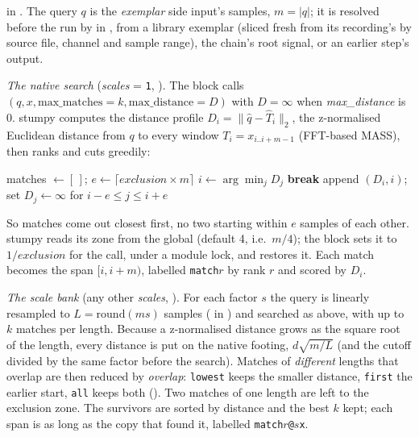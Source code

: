  in . The query $q$ is the \emph{exemplar}
side input's samples, $m = |q|$; it is resolved before the run by
 in , from a library exemplar (sliced fresh
from its recording's  by source file, channel and sample range), the chain's root signal,
or an earlier step's output.

\emph{The native search} (\emph{scales} = \texttt{1}, ). The block calls
$(q, x, \text{max\_matches}=k, \text{max\_distance}=D)$ with $D = \infty$ when
\emph{max\_distance} is 0. stumpy computes the distance profile
$D_i = \lVert \hat q - \hat T_i \rVert_2$, the z-normalised Euclidean distance from $q$ to every
window $T_i = x_{i..i+m-1}$ (FFT-based MASS), then ranks and cuts greedily:
\begin{algorithmic}[1]
\State matches $\gets [\,]$; $e \gets \lceil \textit{exclusion} \times m \rceil$
\Loop
  \State $i \gets \arg\min_j D_j$
   \textbf{break} \EndIf
  \State append $(D_i, i)$; set $D_j \gets \infty$ for $i - e \le j \le i + e$
\EndLoop
\end{algorithmic}
So matches come out closest first, no two starting within $e$ samples of each other. stumpy reads
its zone from the global  (default 4, i.e.\ $m/4$); the
block sets it to $1/\textit{exclusion}$ for the call, under a module lock, and restores it. Each match
becomes the span $[i, i+m)$, labelled \texttt{match$r$} by rank $r$ and scored by $D_i$.

\emph{The scale bank} (any other \emph{scales}, ). For each factor $s$
the query is linearly resampled to $L = \mathrm{round}(m s)$ samples ( in
) and searched as above, with up to $k$ matches per length. Because a
z-normalised distance grows as the square root of the length, every distance is put on the native
footing, $d \sqrt{m/L}$ (and the cutoff divided by the same factor before the search). Matches of
\emph{different} lengths that overlap are then reduced by \emph{overlap}: \texttt{lowest} keeps the
smaller distance, \texttt{first} the earlier start, \texttt{all} keeps both ().
Two matches of one length are left to the exclusion zone. The survivors are sorted by distance and
the best $k$ kept; each span is as long as the copy that found it, labelled
\texttt{match$r$@$s$x}.

